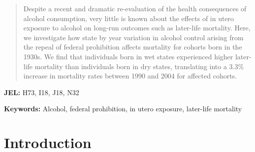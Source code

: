 \documentclass[12pt]{article}
\begin{document}
\begin{titlepage}
    \begin{abstract}
    \begin{normalsize}
    \begin{singlespace}

    \noindent
	Despite a recent and dramatic re-evaluation of the health consequences of alcohol consumption, very little is known about the effects of in utero exposure to alcohol on long-run outcomes such as later-life mortality. 
    Here, we investigate how state by year variation in alcohol control arising from the repeal of federal prohibition affects mortality for cohorts born in the 1930s. 
    We find that individuals born in wet states experienced higher later-life mortality than individuals born in dry states, translating into a 3.3\% increase in mortality rates between 1990 and 2004 for affected cohorts.
	\end{singlespace}
    \end{normalsize}
    \end{abstract}
    
    \noindent\textbf{JEL:} H73, I18, J18, N32
    \vspace{.6cm} 
    
    \noindent\textbf{Keywords:} Alcohol, federal prohibition, in utero exposure, later-life mortality
    \setcounter{footnote}{0}
    

\end{titlepage}
\newpage

\doparttoc %
\faketableofcontents %

\FloatBarrier
\renewcommand{\thefootnote}{\arabic{footnote}}

\setlength{\floatsep}{10pt}
\setlength{\textfloatsep}{0pt}


\onehalfspacing 
\section{Introduction} \label{sec:intro}
\end{document}
